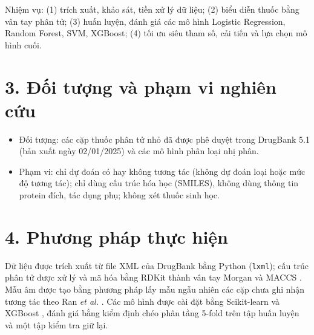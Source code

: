 \documentclass[12pt,a4paper,oneside]{report}
\begin{document}
Nhiệm vụ: (1) trích xuất, khảo sát, tiền xử lý dữ liệu; (2) biểu diễn
thuốc bằng vân tay phân tử; (3) huấn luyện, đánh giá các mô hình Logistic
Regression, Random Forest, SVM, XGBoost; (4) tối ưu siêu tham số, cải tiến và
lựa chọn mô hình cuối.

\section*{3. Đối tượng và phạm vi nghiên cứu}
\begin{itemize}
  \item Đối tượng: các cặp thuốc phân tử nhỏ đã được phê duyệt trong
        DrugBank 5.1 (bản xuất ngày 02/01/2025) và các mô hình phân loại nhị phân.
  \item Phạm vi: chỉ dự đoán có hay không tương tác (không dự
        đoán loại hoặc mức độ tương tác); chỉ dùng cấu trúc hóa học (SMILES),
        không dùng thông tin protein đích, tác dụng phụ; không xét thuốc sinh học.
\end{itemize}

\section*{4. Phương pháp thực hiện}
Dữ liệu được trích xuất từ file XML của DrugBank bằng Python (\texttt{lxml});
cấu trúc phân tử được xử lý và mã hóa bằng RDKit \cite{rdkit} thành vân tay
Morgan \cite{rogers2010} và MACCS \cite{durant2002}. Mẫu âm được tạo bằng
phương pháp lấy mẫu ngẫu nhiên các cặp chưa ghi nhận tương tác theo Ran
\textit{et al.} \cite{ran2022}. Các mô hình được cài đặt bằng Scikit-learn
\cite{pedregosa2011} và XGBoost \cite{chen2016}, đánh giá bằng kiểm định chéo
phân tầng 5-fold trên tập huấn luyện và một tập kiểm tra giữ lại.
\end{document}
